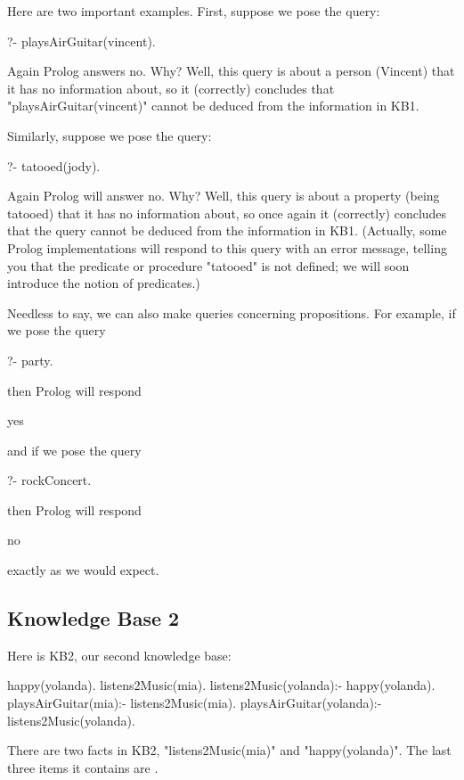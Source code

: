 Here are two important examples. First, suppose we pose the query:
\begin{LPNcodedisplay}
?- playsAirGuitar(vincent).
\end{LPNcodedisplay}
Again Prolog answers no. Why? Well, this query is about a person (Vincent)
that it has no information about, so it (correctly) concludes that
"playsAirGuitar(vincent)" cannot be deduced from the information in KB1.

Similarly, suppose we pose the query:
\begin{LPNcodedisplay}
?- tatooed(jody).
\end{LPNcodedisplay}
Again Prolog will answer no. Why? Well, this query is about a property
(being tatooed) that it has no information about, so once again it
(correctly) concludes that the query cannot be deduced from the
information in KB1.  (Actually, some Prolog implementations will
respond to this query with an error message, telling you that the
predicate or procedure "tatooed" is not defined; we will soon
introduce the notion of predicates.)

Needless to say, we can also make queries concerning propositions. For example,
if we pose the query
\begin{LPNcodedisplay}
?- party.
\end{LPNcodedisplay}
then Prolog will respond
\begin{LPNcodedisplay}
yes
\end{LPNcodedisplay}
and if we pose the query
\begin{LPNcodedisplay}
?- rockConcert.
\end{LPNcodedisplay}
then Prolog will respond
\begin{LPNcodedisplay}
no
\end{LPNcodedisplay}
exactly as we would expect.

\subsection*{Knowledge Base 2}\label{SUBSEC.L1.KB2}

Here is KB2, our second knowledge base:

\begin{LPNcodedisplay}
happy(yolanda).
listens2Music(mia).
listens2Music(yolanda):- happy(yolanda).
playsAirGuitar(mia):- listens2Music(mia).
playsAirGuitar(yolanda):- listens2Music(yolanda).
\end{LPNcodedisplay}
There are two facts in KB2, "listens2Music(mia)" and "happy(yolanda)".
The last three items it contains are .

